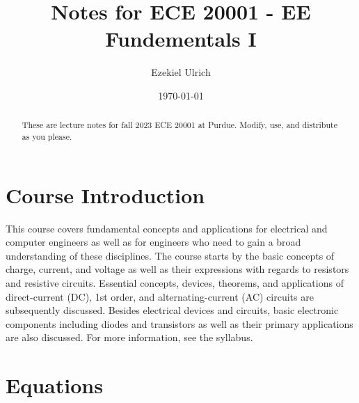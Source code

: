 \documentclass[nobib]{tufte-handout}
\title{Notes for ECE 20001 - EE Fundementals I}
\author[Ezekiel Ulrich]{Ezekiel Ulrich}
\date{\today}  %
\begin{document}
\maketitle

\begin{abstract}
These are lecture notes for fall 2023 ECE 20001 at Purdue. Modify, use, and distribute as you please.
\end{abstract}

\tableofcontents

\section{Course Introduction}

This course covers fundamental concepts and applications 
for electrical and computer engineers as well as for engineers
 who need to gain a broad understanding of these disciplines. 
 The course starts by the basic concepts of charge, current, 
 and voltage as well as their expressions with regards to 
 resistors and resistive circuits. Essential concepts, 
 devices, theorems, and applications of direct-current (DC), 
 1st order, and alternating-current (AC) circuits are 
 subsequently discussed. Besides electrical devices and 
 circuits, basic electronic components including diodes and 
 transistors as well as their primary applications are also 
 discussed. For more information, see the syllabus. 

\pagebreak 

\section{Equations}
\end{document}
